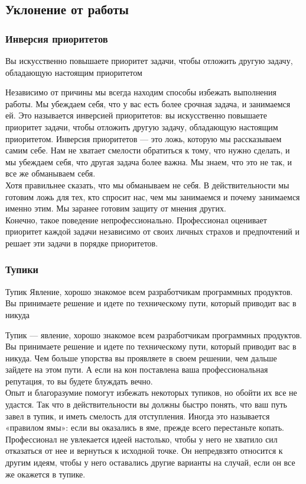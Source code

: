 \documentclass{../industrial-development}
\begin{document}
\subsection{Уклонение от работы}
\begin{frame} \frametitle{Инверсия приоритетов}
\begin{block}{}
Вы искусственно повышаете приоритет задачи, чтобы отложить другую задачу, обладающую настоящим приоритетом
\end{block}
\end{frame}
\lecturenotes
Независимо от причины мы всегда находим способы избежать выполнения работы. Мы убеждаем себя, что у вас есть более срочная задача, и занимаемся ей. Это называется инверсией приоритетов: вы искусственно повышаете приоритет задачи, чтобы отложить другую задачу, обладающую настоящим приоритетом. Инверсия приоритетов — это ложь, которую мы рассказываем самим себе. Нам не хватает смелости обратиться к тому, что нужно сделать, и мы убеждаем себя, что другая задача более важна. Мы знаем, что это не так, и все же обманываем себя.\\
Хотя правильнее сказать, что мы обманываем не себя. В действительности мы готовим ложь для тех, кто спросит нас, чем мы занимаемся и почему занимаемся именно этим. Мы заранее готовим защиту от мнения других.\\
Конечно, такое поведение непрофессионально. Профессионал оценивает приоритет каждой задачи независимо от своих личных страхов и предпочтений и решает эти задачи в порядке приоритетов.

\begin{frame} \frametitle{Тупики}
\begin{block}{Тупик}
Явление, хорошо знакомое всем разработчикам программных продуктов. Вы принимаете решение и идете по техническому пути, который приводит вас в никуда
\end{block}
\end{frame}
\lecturenotes
Тупик — явление, хорошо знакомое всем разработчикам программных продуктов. Вы принимаете решение и идете по техническому пути, который приводит вас в никуда. Чем больше упорства вы проявляете в своем решении, чем дальше зайдете на этом пути. А если на кон поставлена ваша профессиональная репутация, то вы будете блуждать вечно.\\
Опыт и благоразумие помогут избежать некоторых тупиков, но обойти их все не удастся. Так что в действительности вы должны быстро понять, что ваш путь завел в тупик, и иметь смелость для отступления. Иногда это называется «правилом ямы»: если вы оказались в яме, прежде всего перестаньте копать.\\
Профессионал не увлекается идеей настолько, чтобы у него не хватило сил отказаться от нее и вернуться к исходной точке. Он непредвзято относится к другим идеям, чтобы у него оставались другие варианты на случай, если он все же окажется в тупике.
\end{document}
